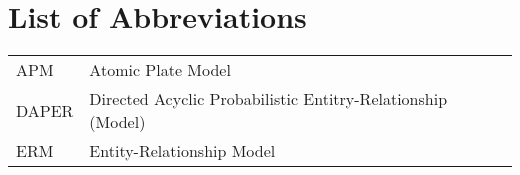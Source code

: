 \section*{List of Abbreviations}

\begin{tabular}{ll}
APM & Atomic Plate Model\\
DAPER & Directed Acyclic Probabilistic Entitry-Relationship (Model)\\
ERM & Entity-Relationship Model
\end{tabular}